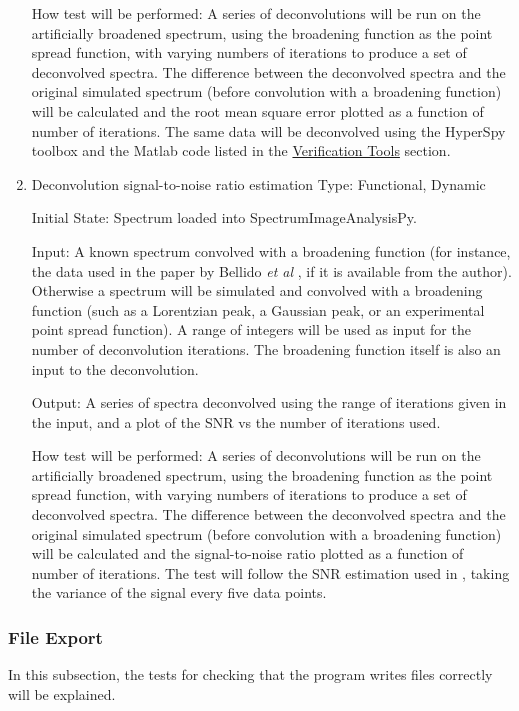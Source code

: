 \documentclass[12pt, titlepage]{article}
\newcommand{\progname}{SpectrumImageAnalysisPy}
\begin{document}
\begin{enumerate}
How test will be performed: A series of deconvolutions will be run on the
artificially broadened spectrum, using the broadening function as the point
spread function, with varying numbers of iterations to produce a set of
deconvolved spectra. The difference between the deconvolved spectra and the
original simulated spectrum (before convolution with a broadening function) will
be calculated and the root mean square error plotted as a function of number of
iterations. The same data will be deconvolved using the HyperSpy toolbox and the
Matlab code listed in the \hyperref[subsec:VerificationTools]{Verification
Tools} section.\\


\item{Deconvolution signal-to-noise ratio estimation}
\label{TFR:RLSNR}
Type: Functional, Dynamic
					
Initial State: Spectrum loaded into \progname{}.

Input: A known spectrum convolved with a broadening function (for instance, the
data used in the paper by Bellido \textit{et al} \cite{bellido_toward_2014}, if
it is available from the author). Otherwise a spectrum will be simulated and
convolved with a broadening function (such as a Lorentzian peak, a Gaussian
peak, or an experimental point spread function). A range of integers will be
used as input for the number of deconvolution iterations. The broadening
function itself is also an input to the deconvolution.

Output: A series of spectra deconvolved using the range of iterations given in
the input, and a plot of the SNR vs the number of iterations used.
					
How test will be performed: A series of deconvolutions will be run on the
artificially broadened spectrum, using the broadening function as the point
spread function, with varying numbers of iterations to produce a set of
deconvolved spectra. The difference between the deconvolved spectra and the
original simulated spectrum (before convolution with a broadening function) will
be calculated and the signal-to-noise ratio plotted as a function of number of
iterations. The test will follow the SNR estimation used in
\cite{bellido_toward_2014}, taking the variance of the signal every five data
points.\\

\end{enumerate}

\subsubsection{File Export}
In this subsection, the tests for checking that the program writes files
correctly will be explained.
\end{document}
